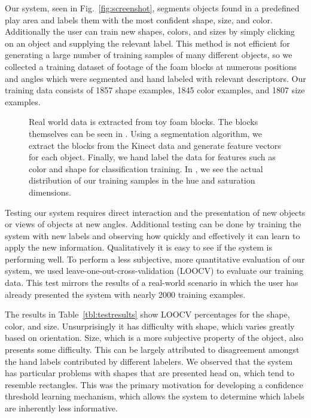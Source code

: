 \documentclass[11pt]{article}
\begin{document}
Our system, seen in Fig.~\ref{fig:screenshot}, segments objects found in a
predefined play area and labels them with the most confident shape, size, and
color.  Additionally the user can train new shapes, colors, and sizes by simply
clicking on an object and supplying the relevant label. This method is not
efficient for generating a
large number of training samples of many different objects, so we collected a
training dataset of footage of the foam blocks at numerous positions and angles
which were segmented and hand labeled with relevant
descriptors. Our training data consists of 1857 shape examples, 1845 color
examples, and 1807 size examples.

\begin{figure}[h!]
\centering
{}
\caption{Real world data is extracted from toy foam blocks. The blocks
    themselves can be seen in . Using a segmentation
    algorithm, we extract the blocks from the Kinect data 
    and generate feature vectors for each object.
    Finally, we hand label the data for features such as color and shape for
    classification training. In , we see the actual
    distribution of our training samples in the hue and saturation
    dimensions.}
\label{fig:objects}
\end{figure}

Testing our system requires direct interaction and the presentation of new objects
or views of objects at new angles. Additional testing can be done by training the
system with new labels and observing how quickly and effectively it
can learn to apply the new information. Qualitatively it is easy to see
if the system is performing well. To perform a less subjective, more quantitative
evaluation of our system, we used leave-one-out-cross-validation (LOOCV) to
evaluate our training data. This test mirrors the results of a real-world
scenario in which the user has already presented the system with nearly 2000 training
examples.

The results in Table~\ref{tbl:testresults} show LOOCV percentages
for the shape, color, and size. Unsurprisingly it has difficulty with shape,
which varies greatly based on orientation. Size, which is a more subjective
property of the object, also presents some difficulty. This can be largely
attributed to disagreement amongst the hand labels contributed by different
labelers. We observed that the system has particular problems with shapes that
are presented head on, which tend to resemble rectangles.  This was the primary
motivation for developing a confidence threshold learning mechanism, which
allows the system to determine which labels are inherently less informative.
\end{document}
